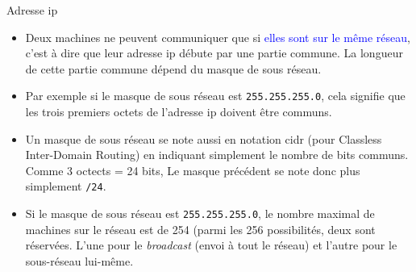 \documentclass[10pt]{beamer}
\begin{document}
\begin{frame}
	\mframe{\Reseau}
	\begin{alertblock}{Adresse ip}
		\begin{itemize}
			\item<1-> Deux machines ne peuvent communiquer que si \textcolor{blue}{elles sont sur le même réseau}, c'est à dire que leur adresse {\sc ip} débute par une partie commune. La longueur de cette partie commune dépend du masque de sous réseau.
			\item<2-> Par exemple si le masque de sous réseau est {\tt 255.255.255.0}, cela signifie que les trois premiers octets de l'adresse {\sc ip} doivent être communs.
			\item<3-> Un masque de sous réseau se note aussi en notation {\sc cidr} (pour Classless Inter-Domain Routing) en indiquant simplement le nombre de bits communs. Comme 3 octects = 24 bits, Le masque précédent se note donc plus simplement {\tt /24}.
			\item<4-> Si le masque de sous réseau est {\tt 255.255.255.0}, le nombre maximal de machines sur le réseau est de 254 (parmi les 256 possibilités, deux sont réservées. L'une pour le \textit{broadcast} (envoi à tout le réseau) et l'autre pour le sous-réseau lui-même.
		\end{itemize}
	\end{alertblock}
\end{frame}
\end{document}
